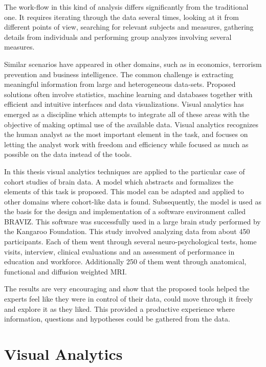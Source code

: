 The work-flow in this kind of analysis differs significantly from the traditional one. It requires iterating through the data several times, looking at it from different points of view, searching for relevant subjects and measures, gathering details from individuals and performing group analyzes involving several measures.

Similar scenarios have appeared in other domains, such as in economics, terrorism prevention and business intelligence. The common challenge is extracting meaningful information from large and heterogeneous data-sets. Proposed solutions often involve statistics, machine learning and databases together with efficient and intuitive interfaces and data visualizations. Visual analytics has emerged as a discipline which attempts to integrate all of these areas with the objective of making optimal use of the available data. Visual analytics recognizes the human analyst as the most important element in the task, and focuses on letting the analyst work with freedom and efficiency while focused as much as possible on the data instead of the tools.

In this thesis visual analytics techniques are applied to the particular case of cohort studies of brain data. A model which abstracts and formalizes the elements of this task is proposed. This model can be adapted and applied to other domains where cohort-like data is found. Subsequently, the model is used as the basis for the design and implementation of a software environment called BRAVIZ. This software was successfully used in a large brain study performed by the Kangaroo Foundation. This study involved analyzing data from about 450 participants. Each of them went through several neuro-psychological tests, home visits, interview, clinical evaluations and an assessment of performance in education and workforce. Additionally 250 of them went through anatomical, functional and diffusion weighted MRI.

The results are very encouraging and show that the proposed tools  helped the experts feel like they were in control of their data, could move through it freely and explore it as they liked. This provided a productive experience where information, questions and hypotheses could be gathered from the data.


\section{Visual Analytics}


